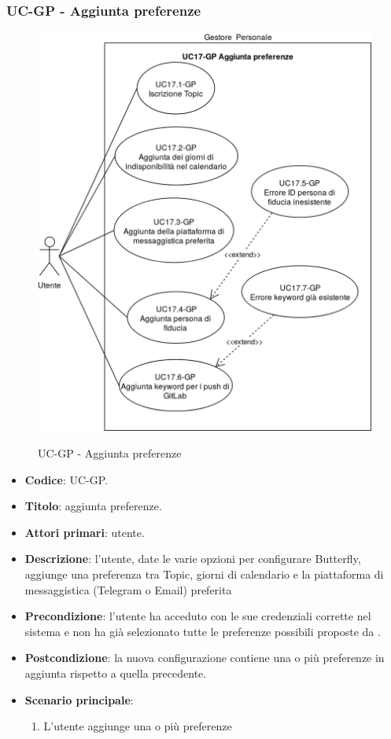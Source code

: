 \subsubsection{UC\theuccount-GP - Aggiunta preferenze}
		\begin{figure}[H]
			\centering
				\includegraphics[width=1\textwidth]{img/casi_d'uso/UC17.png}\\
			\caption{UC\theuccount-GP - Aggiunta preferenze}
		\end{figure}
	\begin{itemize}
		\item \textbf{Codice}: UC\theuccount-GP.
		\item \textbf{Titolo}: aggiunta preferenze.
		\item \textbf{Attori primari}: utente.
		\item \textbf{Descrizione}: l’utente, date le varie opzioni per configurare Butterfly, aggiunge una
		preferenza tra Topic, giorni di calendario e la piattaforma di messaggistica (Telegram o Email) preferita
		\item \textbf{Precondizione}: l’utente ha acceduto con le sue credenziali corrette nel sistema e non ha già selezionato tutte le preferenze possibili proposte da \progetto.
		\item \textbf{Postcondizione}: la nuova configurazione contiene una o più preferenze in aggiunta rispetto a quella precedente.
		\item \textbf{Scenario principale}:
		\begin{enumerate}
			\item L'utente aggiunge una o più preferenze
		\end{enumerate}
	\end{itemize}

